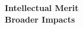 \documentclass[12pt]{article}
\begin{document}
\textbf{Intellectual Merit}
\noindent
\\
\textbf{Broader Impacts}
\noindent


\footnotesize
\begin{thebibliography}{aa}


\end{thebibliography}
\end{document}
